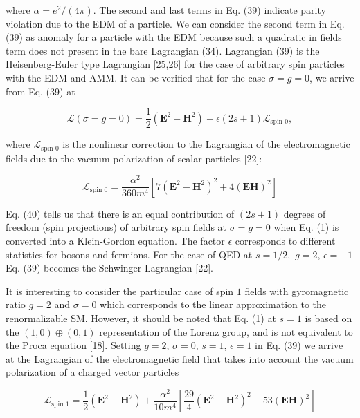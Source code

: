 \documentclass[a4paper,12pt]{article}
\begin{document}
where $\alpha =e^2/(4\pi )$. The second and last terms in Eq. (39) indicate
parity violation due to the EDM of a particle. We can consider the second
term in Eq. (39) as anomaly for a particle with the EDM because such a
quadratic in fields term does not present in the bare Lagrangian (34).
Lagrangian (39) is the Heisenberg-Euler type Lagrangian [25,26] for the case
of arbitrary spin particles with the EDM and AMM. It can be verified that
for the case $\sigma =g=0$, we arrive from Eq. (39) at

\begin{equation}
\mathcal{L}(\sigma =g=0)=\frac 12\left(
\mathbf{E}^2-\mathbf{H}^2\right) +\epsilon
(2s+1)\mathcal{L}_{\mbox{spin 0}},  \label{40}
\end{equation}

where $\mathcal{L}_{\mbox{spin 0}}$ is the nonlinear correction to
the Lagrangian of the electromagnetic fields due to the vacuum
polarization of scalar particles [22]:

\begin{equation}
\mathcal{L}_{\mbox{spin 0}}=\frac{\alpha ^2}{360m^4}\left[ 7\left(
\mathbf{E} ^2-\mathbf{H}^2\right) ^2+4(\mathbf{EH})^2\right]
\label{41}
\end{equation}

Eq. (40) tells us that there is an equal contribution of $(2s+1)$ degrees of
freedom (spin projections) of arbitrary spin fields at $\sigma =g=0$ when
Eq. (1) is converted into a Klein-Gordon equation. The factor $\epsilon$
corresponds to different statistics for bosons and fermions. For the case of
QED at $s=1/2,$ $g=2$, $\epsilon =-1$ Eq. (39) becomes the Schwinger
Lagrangian [22].

It is interesting to consider the particular case of spin $1$ fields with
gyromagnetic ratio $g=2$ and $\sigma =0$ which corresponds to the linear
approximation to the renormalizable SM. However, it should be noted that Eq.
(1) at $s=1$ is based on the $\left( 1,0\right) \oplus \left( 0,1\right)$
representation of the Lorenz group, and is not equivalent to the Proca
equation [18]. Setting $g=2$, $\sigma =0$, $s=1$, $\epsilon =1$ in Eq. (39)
we arrive at the Lagrangian of the electromagnetic field that takes into
account the vacuum polarization of a charged vector particles

\begin{equation}
\mathcal{L}_{\mbox{spin 1}}=\frac 12\left(
\mathbf{E}^2-\mathbf{H}^2\right)+ \frac{\alpha ^2}{10m^4}\left[
\frac{29}4\left( \mathbf{E}^2-\mathbf{H} ^2\right)
^2-53(\mathbf{EH})^2\right]  \label{42}
\end{equation}
\end{document}
